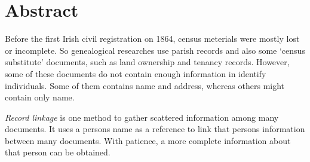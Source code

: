 

\begingroup
\let\clearpage\relax
\let\cleardoublepage\relax
\let\cleardoublepage\relax

\chapter*{Abstract}

Before the first Irish civil registration on 1864, census meterials
were mostly lost or incomplete. So genealogical researches use
parish records and also some `census substitute' documents,
such as land ownership and tenancy records. However, some of these documents
do not contain enough information in identify individuals.
Some of them contains name and address, whereas others might contain only name.

\emph{Record linkage} is one method to gather scattered information among many documents.
It uses a person\textquotesingle s name as a reference to link that
person\textquotesingle s information between many documents. With patience,
a more complete information about that person can be obtained.

%
%
%
%
%

\endgroup
\vfill

